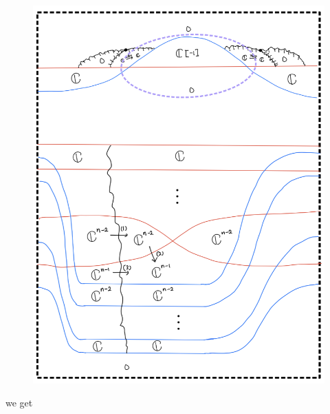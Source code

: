 \begin{enumerate}[label = (\roman*)]
\begin{enumerate}[label = (Case \arabic*)]
\begin{enumerate}[label = (Step \arabic*)]
\begin{figure}[H]
    \centering
    \includegraphics[scale = 0.95]{diagrams/cobord_gen/11.png}
    \caption{}
    \label{fig:your-label}
\end{figure}

we get


\end{enumerate}
\end{enumerate}
\end{enumerate}
